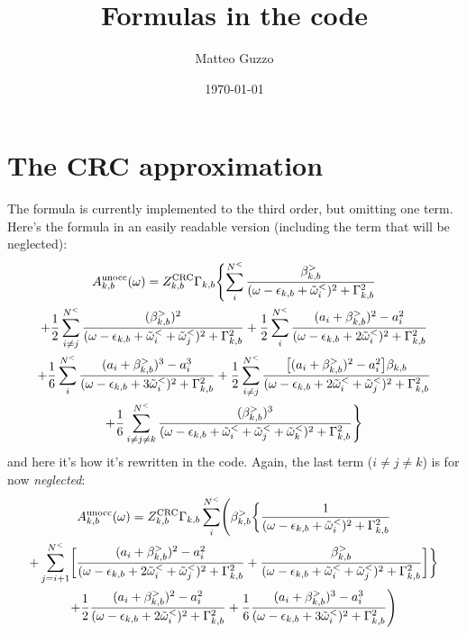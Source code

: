 \documentclass[a4paper,12pt]{article}
\title{Formulas in the code}
\author{Matteo Guzzo}
\date{\today}
\begin{document}
\maketitle

\tableofcontents

\section{The CRC approximation}

The formula is currently implemented to the third order, but omitting one term. 
Here's the formula in an easily readable version (including the term that will be neglected):
\begin{multline}
 A_{k,b}^\textnormal{unocc}(\omega) = Z_{k,b}^\textnormal{CRC} \Gamma_{k,b} \Biggl\{ 
  \sum_i^{N^<} \frac{\beta_{k,b}^>}{(\omega - \epsilon_{k,b} + \tilde\omega_i^<)^2 + \Gamma_{k,b}^2} \\
 + \frac12 \sum_{i\neq j}^{N^<} 
\frac{(\beta_{k,b}^>)^2}{(\omega - \epsilon_{k,b} + \tilde\omega_i^< + \tilde\omega_j^<)^2 + \Gamma_{k,b}^2}
 + \frac12 \sum_i^{N^<} \frac{(a_i + \beta_{k,b}^>)^2 - a_i^2}{(\omega - \epsilon_{k,b} + 2 \tilde\omega_i^<)^2 + \Gamma_{k,b}^2} \\
 + \frac16 \sum_i^{N^<} \frac{(a_i + \beta_{k,b}^>)^3 - a_i^3}{(\omega - \epsilon_{k,b} + 3 \tilde\omega_i^<)^2 + \Gamma_{k,b}^2} 
 + \frac12 \sum_{i\neq j}^{N^<} \frac{\bigl[(a_i + \beta_{k,b}^>)^2 - a_i^2\bigr] \beta_{k,b} }
  {(\omega - \epsilon_{k,b} + 2\tilde\omega_i^< + \tilde\omega_j^<)^2 + \Gamma_{k,b}^2} \\
 + \frac16 \sum_{i\neq j\neq k}^{N^<} 
\frac{(\beta_{k,b}^>)^3}{(\omega - \epsilon_{k,b} + \tilde\omega_i^< + \tilde\omega_j^< + \tilde\omega_k^<)^2 + \Gamma_{k,b}^2}
\Biggr\}
\end{multline}
and here it's how it's rewritten in the code. Again, the last term ($i\neq j\neq k$) is for now \emph{neglected}: 
\begin{multline}
 A_{k,b}^\textnormal{unocc}(\omega) = Z_{k,b}^\textnormal{CRC} \Gamma_{k,b}  \sum_i^{N^<} \Biggl( \beta_{k,b}^> \biggl\{
 \frac1{(\omega - \epsilon_{k,b} + \tilde\omega_i^<)^2 + \Gamma_{k,b}^2}  \\ 
  + \sum_{j=i+1}^{N^<} \biggl[ \frac{(a_i + \beta_{k,b}^>)^2 - a_i^2 }
  {(\omega - \epsilon_{k,b} + 2 \tilde\omega_i^< + \tilde\omega_j^<)^2 + \Gamma_{k,b}^2} 
 + \frac{\beta_{k,b}^>}{(\omega - \epsilon_{k,b} + \tilde\omega_i^< + \tilde\omega_j^<)^2 + \Gamma_{k,b}^2}
 \biggr] \biggr\} \\
 + \frac12 \frac{(a_i + \beta_{k,b}^>)^2 - a_i^2}{(\omega - \epsilon_{k,b} + 2 \tilde\omega_i^<)^2 + \Gamma_{k,b}^2} 
 + \frac16 \frac{(a_i + \beta_{k,b}^>)^3 - a_i^3}{(\omega - \epsilon_{k,b} + 3 \tilde\omega_i^<)^2 + \Gamma_{k,b}^2} 
 \Biggl)
\end{multline}
\end{document}
